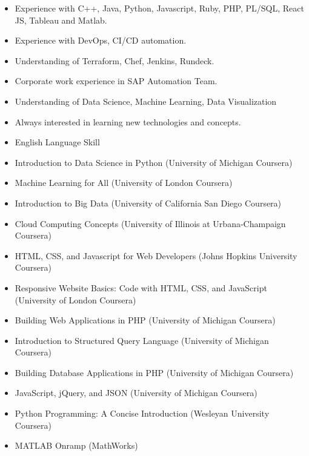 \documentclass[10pt,a4paper,ragged2e,withhyper]{altacv}
\begin{document}
\begin{paracol}{2}
\begin{itemize}
\item Experience with C++, Java, Python, Javascript, Ruby, PHP, PL/SQL, React JS, Tableau and Matlab.
\item Experience with DevOps, CI/CD automation.
\item Understanding of Terraform, Chef, Jenkins, Rundeck.
\item Corporate work experience in SAP Automation Team.
\item Understanding of Data Science, Machine Learning, Data Visualization
\item Always interested in learning new technologies and concepts. 
\item English Language Skill
\end{itemize}

\divider



\begin{itemize}
\item Introduction to Data Science in Python (University of Michigan Coursera)
\item Machine Learning for All (University of London Coursera)
\item Introduction to Big Data (University of California San Diego Coursera)
\item Cloud Computing Concepts (University of Illinois at Urbana-Champaign Coursera)
\item HTML, CSS, and Javascript for Web Developers (Johns Hopkins University Coursera)
\item Responsive Website Basics: Code with HTML, CSS, and JavaScript (University of London Coursera)
\item Building Web Applications in PHP (University of Michigan Coursera)
\item Introduction to Structured Query Language (University of Michigan Coursera)
\item Building Database Applications in PHP (University of Michigan Coursera)
\item JavaScript, jQuery, and JSON (University of Michigan Coursera)
\item Python Programming: A Concise Introduction (Wesleyan University Coursera)
\item MATLAB Onramp (MathWorks)
\end{itemize}




\end{paracol}
\end{document}
